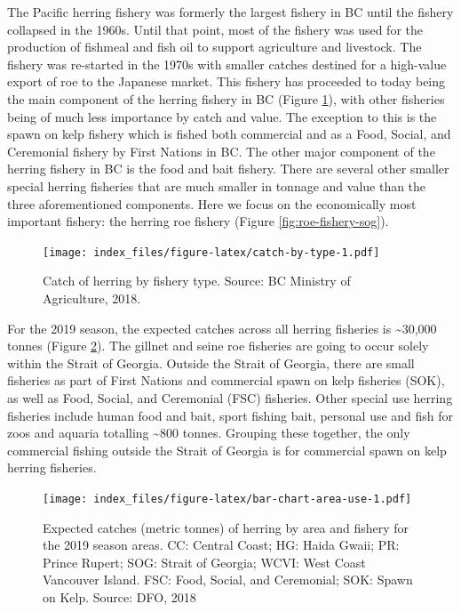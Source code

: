 \documentclass[]{article}
\theoremstyle{definition}
\theoremstyle{definition}
\theoremstyle{definition}
\theoremstyle{remark}
\begin{document}
The Pacific herring fishery was formerly the largest fishery in BC until
the fishery collapsed in the 1960s. Until that point, most of the
fishery was used for the production of fishmeal and fish oil to support
agriculture and livestock. The fishery was re-started in the 1970s with
smaller catches destined for a high-value export of roe to the Japanese
market. This fishery has proceeded to today being the main component of
the herring fishery in BC (Figure \ref{fig:catch-by-type}), with other
fisheries being of much less importance by catch and value. The
exception to this is the spawn on kelp fishery which is fished both
commercial and as a Food, Social, and Ceremonial fishery by First
Nations in BC. The other major component of the herring fishery in BC is
the food and bait fishery. There are several other smaller special
herring fisheries that are much smaller in tonnage and value than the
three aforementioned components. Here we focus on the economically most
important fishery: the herring roe fishery (Figure
\ref{fig:roe-fishery-sog}).

\begin{figure}
\centering
\texttt{[image: index\_files/figure-latex/catch-by-type-1.pdf]}
\caption{\label{fig:catch-by-type}Catch of herring by fishery type. Source:
BC Ministry of Agriculture, 2018.}
\end{figure}

For the 2019 season, the expected catches across all herring fisheries
is \textasciitilde{}30,000 tonnes (Figure \ref{fig:bar-chart-area-use}).
The gillnet and seine roe fisheries are going to occur solely within the
Strait of Georgia. Outside the Strait of Georgia, there are small
fisheries as part of First Nations and commercial spawn on kelp
fisheries (SOK), as well as Food, Social, and Ceremonial (FSC)
fisheries. Other special use herring fisheries include human food and
bait, sport fishing bait, personal use and fish for zoos and aquaria
totalling \textasciitilde{}800 tonnes. Grouping these together, the only
commercial fishing outside the Strait of Georgia is for commercial spawn
on kelp herring fisheries.

\begin{figure}
\centering
\texttt{[image: index\_files/figure-latex/bar-chart-area-use-1.pdf]}
\caption{\label{fig:bar-chart-area-use}Expected catches (metric tonnes) of
herring by area and fishery for the 2019 season areas. CC: Central
Coast; HG: Haida Gwaii; PR: Prince Rupert; SOG: Strait of Georgia; WCVI:
West Coast Vancouver Island. FSC: Food, Social, and Ceremonial; SOK:
Spawn on Kelp. Source: DFO, 2018}
\end{figure}
\end{document}

